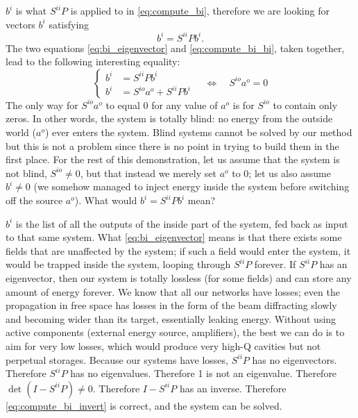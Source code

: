 $b^i$ is what $S^{ii}P$ is applied to in \cref{eq:compute_bi}, therefore we are looking for vectors $b^i$ satisfying
\begin{equation}
    b^i = S^{ii}P b^i \text{.} \label{eq:bi_eigenvector}
\end{equation}
The two equations \cref{eq:bi_eigenvector} and  \cref{eq:compute_bi_bi}, taken together, 
lead to the following interesting equality:
\begin{equation}
    \left\lbrace
        \begin{aligned}
            b^i &= S^{ii}P b^i \\
            b^i &= S^{io}a^o + S^{ii}P b^i
        \end{aligned}
    \right.
    \quad
    \Longleftrightarrow
    \quad
    S^{io}a^o = 0
\end{equation}
The only way for $S^{io}a^o$ to equal 0 for any value of $a^o$ is for $S^{io}$ to contain only zeros.
In other words, the system is totally blind: no energy from the outside world ($a^o$) ever enters the system.
Blind systems cannot be solved by our method but this is not a problem since there is no point in trying to build them in the first place.
For the rest of this demonstration, let us assume that the system is not blind, $S^{io}\neq 0$, but that instead we merely set $a^o$ to 0; let us also assume $b^i \neq 0$ (we somehow managed to inject energy inside the system before switching off the source $a^o$).
What would $b^i = S^{ii}P b^i$ mean?

$b^i$ is the list of all the outputs of the inside part of the system, fed back as input to that same system.
What \cref{eq:bi_eigenvector} means is that there exists some fields that are unaffected by the system; if such a field would enter the system, it would be trapped inside the system, looping through $S^{ii}P$ forever.
If $S^{ii}P$ has an eigenvector, then our system is totally lossless (for some fields) and can store any amount of energy forever.
We know that all our networks have losses; even the propagation in free space has losses in the form of the beam diffracting slowly and becoming wider than its target, essentially leaking energy.
Without using active components (external energy source, amplifiers), the best we can do is to aim for very low losses, which would produce very high-Q cavities but not perpetual storages.
Because our systems have losses, $S^{ii}P$ has no eigenvectors.
Therefore $S^{ii}P$ has no eigenvalues.
Therefore 1 is not an eigenvalue.
Therefore $\det(I-S^{ii}P) \neq 0$.
Therefore $I-S^{ii}P$ has an inverse.
Therefore \cref{eq:compute_bi_invert} is correct, and the system can be solved.

